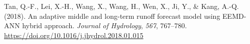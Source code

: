 \documentclass[
]{agujournal2019}
\newlength{\cslhangindent}
\newenvironment{CSLReferences}[2] %
 {\begin{list}{}{%
  \setlength{\itemindent}{0pt}
  \setlength{\leftmargin}{0pt}
  \setlength{\parsep}{0pt}
  \ifodd #1
   \setlength{\leftmargin}{\cslhangindent}
   \setlength{\itemindent}{-1\cslhangindent}
  \fi
  \setlength{\itemsep}{#2\baselineskip}}}
 {\end{list}}
\begin{document}
\begin{CSLReferences}{1}{0}
Tan, Q.-F., Lei, X.-H., Wang, X., Wang, H., Wen, X., Ji, Y., \& Kang,
A.-Q. (2018). An adaptive middle and long-term runoff forecast model
using {EEMD-ANN} hybrid approach. \emph{Journal of Hydrology},
\emph{567}, 767--780.
\url{https://doi.org/10.1016/j.jhydrol.2018.01.015}

\end{CSLReferences}
\end{document}
